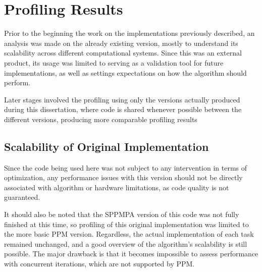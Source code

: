 \documentclass[main.tex]{subfiles}
\begin{document}
\chapter{Profiling Results} \label{chapter:results}

Prior to the beginning the work on the implementations previously described, an analysis was made on the already existing version, mostly to understand its scalability across different computational systems. Since this was an external product, its usage was limited to serving as a validation tool for future implementations, as well as settings expectations on how the algorithm should perform.

Later stages involved the profiling using only the versions actually produced during this dissertation, where code is shared whenever possible between the different versions, producing more comparable profiling results


\section{Scalability of Original Implementation}

Since the code being used here was not subject to any intervention in terms of optimization, any performance issues with this version should not be directly associated with algorithm or hardware limitations, as code quality is not guaranteed.

It should also be noted that the SPPMPA version of this code was not fully finished at this time, so profiling of this original implementation was limited to the more basic PPM version. Regardless, the actual implementation of each task remained unchanged, and a good overview of the algorithm's scalability is still possible. The major drawback is that it becomes impossible to assess performance with concurrent iterations, which are not supported by PPM.



\end{document}
